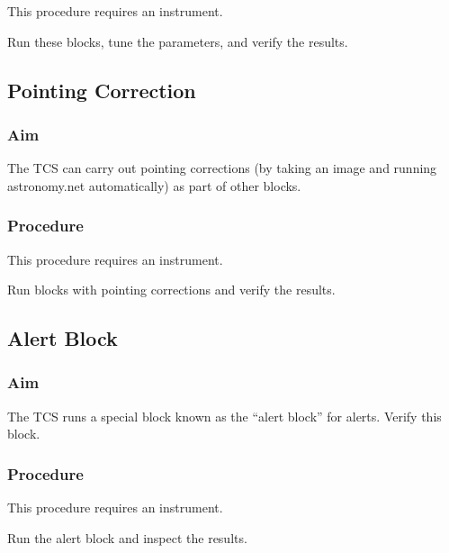 \documentclass{article}
\begin{document}
This procedure requires an instrument.

Run these blocks, tune the parameters, and verify the results.


\subsection{Pointing Correction}

\subsubsection{Aim}

The TCS can carry out pointing corrections (by taking an image and running astronomy.net automatically) as part of other blocks.

\subsubsection{Procedure}

This procedure requires an instrument.

Run blocks with pointing corrections and verify the results.


\subsection{Alert Block}

\subsubsection{Aim}

The TCS runs a special block known as the “alert block” for alerts. Verify this block.

\subsubsection{Procedure}

This procedure requires an instrument.

Run the alert block and inspect the results.

\end{document}
